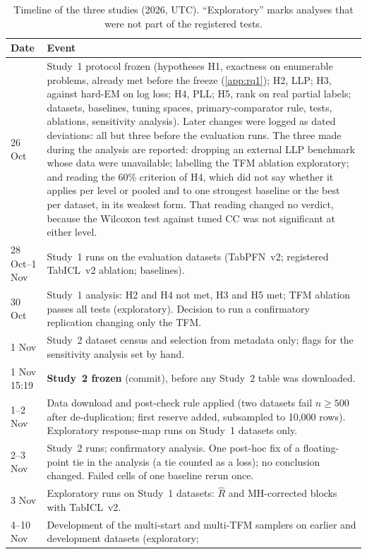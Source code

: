\begin{table}[!htbp]
\centering
\caption{Timeline of the three studies (2026, UTC). ``Exploratory'' marks analyses that were not part of the registered
tests.}
\label{tab:timeline}
\small
\begin{tabular}{@{}lp{}@{}}
\toprule
Date & Event \\
\midrule
26 Oct & Study~1 protocol frozen (hypotheses H1, exactness on enumerable problems, already met before the freeze
(\cref{app:rq1}); H2, LLP; H3, against hard-EM on log loss; H4, PLL; H5, rank on real partial labels; datasets, baselines, tuning spaces, primary-comparator rule, tests,
ablations, sensitivity analysis). Later changes were logged as dated deviations: all but three before the evaluation
runs. The three made during the analysis are reported: dropping an external LLP benchmark whose data were unavailable;
labelling the TFM ablation exploratory; and reading the 60\% criterion of H4, which did not say whether it applies per
level or pooled and to one strongest baseline or the best per dataset, in its weakest form. That reading changed no
verdict, because the Wilcoxon test against tuned CC was not significant at either level. \\
28 Oct--1 Nov & Study~1 runs on the evaluation datasets (TabPFN~v2; registered TabICL~v2 ablation; baselines). \\
30 Oct & Study~1 analysis: H2 and H4 not met, H3 and H5 met; TFM ablation passes all tests (exploratory).
Decision to run a confirmatory replication changing only the TFM. \\
1 Nov & Study~2 dataset census and selection from metadata only; flags for the sensitivity analysis set by hand. \\
1 Nov 15:19 & \textbf{Study~2 frozen} (commit), before any Study~2 table was downloaded. \\
1--2 Nov & Data download and post-check rule applied (two datasets fail $n\ge500$ after de-duplication; first reserve
added, subsampled to 10{,}000 rows). Exploratory response-map runs on Study~1 datasets only. \\
2--3 Nov & Study~2 runs; confirmatory analysis. One post-hoc fix of a floating-point tie in
the analysis (a tie counted as a loss); no conclusion changed. Failed cells of one baseline rerun once. \\
3 Nov & Exploratory runs on Study~1 datasets: $\widehat R$ and MH-corrected blocks with TabICL~v2. \\
4--10 Nov & Development of the multi-start and multi-TFM samplers on earlier and development datasets (exploratory;

\end{tabular}
\end{table}
